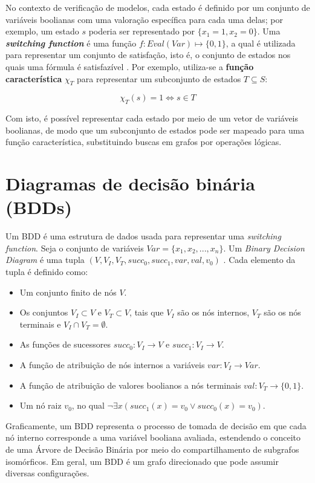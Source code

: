 \documentclass[cic,tc]{infufrgs}
\begin{document}
	No contexto de verificação de modelos, cada estado é definido por um conjunto de variáveis boolianas com uma valoração específica para cada uma delas; por exemplo, um estado $s$ poderia ser representado por $\{x_1=1, x_2=0\}$. 
	Uma \textbf{\textit{switching function}} é uma função $f: Eval(Var) \mapsto \{0,1\}$, a qual é utilizada para representar um conjunto de satisfação, isto é, o conjunto de estados nos quais uma fórmula é satisfazível \cite{baierPrinciplesModelChecking2008a}. 
	Por exemplo, utiliza-se a \textbf{função característica} $\chi_T$ para representar um subconjunto de estados $T \subseteq S$:
	
	\begin{equation}
		\chi_T(s) = 1 \iff s \in T
	\end{equation}
	
	Com isto, é possível representar cada estado por meio de um vetor de variáveis boolianas, de modo que um subconjunto de estados pode ser mapeado para uma função característica, substituindo buscas em grafos por operações lógicas.
	
	\section{Diagramas de decisão binária (BDDs)}
	
	Um BDD é uma estrutura de dados usada para representar uma \textit{switching function}. Seja o conjunto de variáveis $Var =\{x_1,x_2,...,x_n\}$. Um \textit{Binary Decision Diagram} é uma tupla $(V,V_I,V_T,succ_0,succ_1,var,val,v_0)$ \cite{baierPrinciplesModelChecking2008a}. Cada elemento da tupla é definido como:
	\begin{itemize}
		\item Um conjunto finito de nós $V$.
		\item Os conjuntos $V_I\subset V$ e $V_T\subset V$, tais que $V_I$ são os nós internos, $V_T$ são os nós terminais e $V_I\cap V_T=\emptyset$.
		\item As funções de sucessores $succ_0: V_I\to V$ e $succ_1: V_I\to V$.
		\item A função de atribuição de nós internos a variáveis $var: V_I\to Var$.
		\item A função de atribuição de valores boolianos a nós terminais $val: V_T\to \{0,1\}$.
		\item Um nó raiz $v_0$, no qual $\neg\exists x(succ_1(x)=v_0\lor succ_0(x)=v_0)$.
	\end{itemize}
	
	Graficamente, um BDD representa o processo de tomada de decisão em que cada nó interno corresponde a uma variável booliana avaliada, estendendo o conceito de uma Árvore de Decisão Binária por meio do compartilhamento de subgrafos isomórficos.
	Em geral, um BDD é um grafo direcionado que pode assumir diversas configurações.
	
\end{document}
